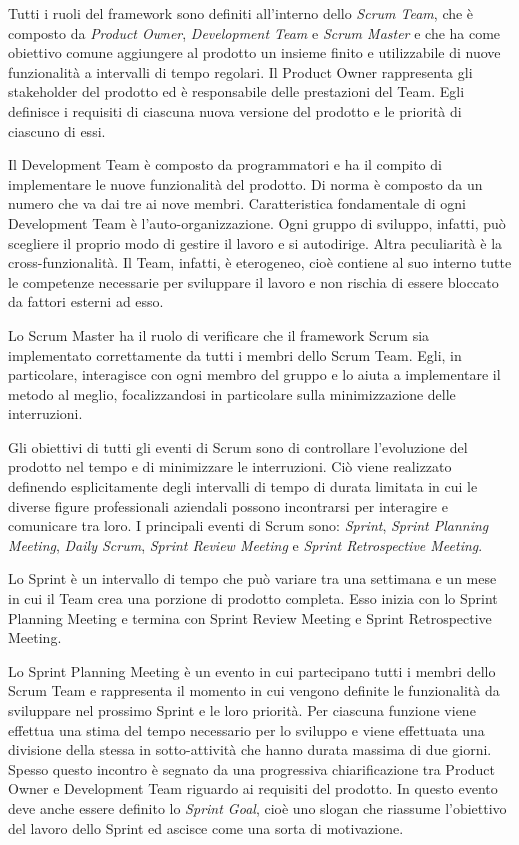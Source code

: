 			Tutti i ruoli del framework sono definiti all'interno dello \emph{Scrum Team}, che è composto da \emph{Product Owner}, \emph{Development Team} e \emph{Scrum Master} e che ha come obiettivo comune aggiungere al prodotto un insieme finito e utilizzabile di nuove funzionalità a intervalli di tempo regolari.
			Il Product Owner rappresenta gli stakeholder del prodotto ed è responsabile delle prestazioni del Team.
			Egli definisce i requisiti di ciascuna nuova versione del prodotto e le priorità di ciascuno di essi.
			
			Il Development Team è composto da programmatori e ha il compito di implementare le nuove funzionalità del prodotto.
			Di norma è composto da un numero che va dai tre ai nove membri.
			Caratteristica fondamentale di ogni Development Team è l'auto-organizzazione. 
			Ogni gruppo di sviluppo, infatti, può scegliere il proprio modo di gestire il lavoro e si autodirige.
			Altra peculiarità è la cross-funzionalità.
			Il Team, infatti, è eterogeneo, cioè contiene al suo interno tutte le competenze necessarie per sviluppare il lavoro e non rischia di essere bloccato da fattori esterni ad esso. 
			
			Lo Scrum Master ha il ruolo di verificare che il framework Scrum sia implementato correttamente da tutti i membri dello Scrum Team.
			Egli, in particolare, interagisce con ogni membro del gruppo e lo aiuta a implementare il metodo al meglio, focalizzandosi in particolare sulla minimizzazione delle interruzioni.

			Gli obiettivi di tutti gli eventi di Scrum sono di controllare l'evoluzione del prodotto nel tempo e di minimizzare le interruzioni. 
			Ciò viene realizzato definendo esplicitamente degli intervalli di tempo di durata limitata in cui le diverse figure professionali aziendali possono incontrarsi per interagire e comunicare tra loro.
			I principali eventi di Scrum sono: \emph{Sprint}, \emph{Sprint Planning Meeting}, \emph{Daily Scrum}, \emph{Sprint Review Meeting} e \emph{Sprint Retrospective Meeting}.

			Lo Sprint è un intervallo di tempo che può variare tra una settimana e un mese in cui il Team crea una porzione di prodotto completa. 
			Esso inizia con lo Sprint Planning Meeting e termina con Sprint Review Meeting e Sprint Retrospective Meeting.
			
			Lo Sprint Planning Meeting è un evento in cui partecipano tutti i membri dello Scrum Team e rappresenta il momento in cui vengono definite le funzionalità da sviluppare nel prossimo Sprint e le loro priorità.
			Per ciascuna funzione viene effettua una stima del tempo necessario per lo sviluppo e viene effettuata una divisione della stessa in sotto-attività che hanno durata massima di due giorni.
			Spesso questo incontro è segnato da una progressiva chiarificazione tra Product Owner e Development Team riguardo ai requisiti del prodotto. 
			In questo evento deve anche essere definito lo \emph{Sprint Goal}, cioè uno slogan che riassume l'obiettivo del lavoro dello Sprint ed ascisce come una sorta di motivazione.
		
